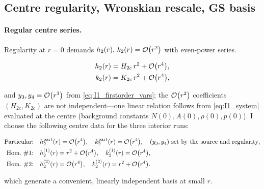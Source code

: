 \documentclass{iopjournal}
\begin{document}
\subsection{Centre regularity, Wronskian rescale, GS basis}\label{app:I2} 

\paragraph{Regular centre series.}
Regularity at \(r=0\) demands \(h_2(r),\,k_2(r)=\order{r^{2}}\) with even-power series.

\begin{equation}
\begin{aligned}
h_2(r) &= H_{2c}\,r^{2} + \order{r^{4}},\\
k_2(r) &= K_{2c}\,r^{2} + \order{r^{4}},
\end{aligned}
\label{eq:I2_centre_series}
\end{equation}

and \(y_3,y_4=\order{r^{3}}\) from \eqref{eq:I1_firstorder_vars}; 
the \(\order{r^{2}}\) coefficients \((H_{2c},K_{2c})\) are not independent—one
linear relation follows from \eqref{eq:I1_system} evaluated at the centre
(background constants \(N(0),A(0),\rho(0),p(0)\)). I choose the following
centre data for the three interior runs:



\begin{align}
\text{Particular:}\quad
& h_2^{\mathrm{part}}(r)=\order{r^{4}}, \quad
  k_2^{\mathrm{part}}(r)=\order{r^{4}}, \quad
  (y_3,y_4)\ \text{set by the source and regularity}, \label{eq:I2_center_part}\\
\text{Hom.\ \#1:}\quad
& h_2^{(1)}(r)=r^{2}+\order{r^{4}}, \quad
  k_2^{(1)}(r)=\order{r^{4}}, \label{eq:I2_center_h1}\\
\text{Hom.\ \#2:}\quad
& h_2^{(2)}(r)=\order{r^{4}}, \quad
  k_2^{(2)}(r)=r^{2}+\order{r^{4}}. \label{eq:I2_center_h2}
\end{align}

which generate a convenient, linearly independent basis at small $r$.
\end{document}
